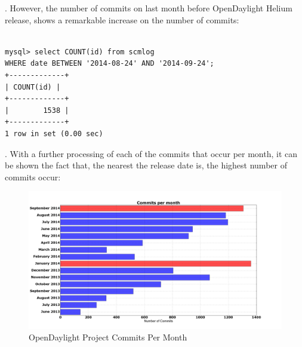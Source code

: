 \documentclass[a4paper, 12pt]{book}
\begin{document}
. However, the number of commits on last month before OpenDaylight Helium release, shows a remarkable increase on the number of commits:

\begin{verbatim}

mysql> select COUNT(id) from scmlog 
WHERE date BETWEEN '2014-08-24' AND '2014-09-24';
+-------------+
| COUNT(id) |
+-------------+
|        1538 |
+-------------+
1 row in set (0.00 sec)

\end{verbatim}
.
With a further processing of each of the commits that occur per month, it can be shown the fact that, the nearest the release date is, the highest number of commits occur:
\begin{center}
 \begin{figure}[H]
 \begin{center}
   \includegraphics[width=17cm]{img/commits_month_01.png}
   \caption{OpenDaylight Project Commits Per Month}
   \label{fig:odl_commits_month}
 \end{center}
 \end{figure}
\end{center}
\end{document}
